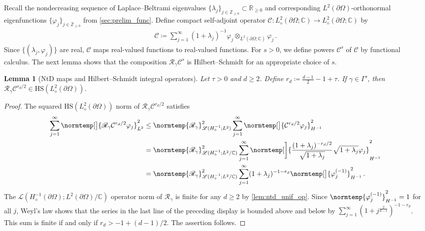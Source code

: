 \documentclass[pdflatex,sn-mathphys-num]{sn-jnl-preprint}
\newcommand{\Z}{\mathbb{Z}}
\newcommand{\R}{\mathbb{R}}
\newcommand{\C}{\mathbb{C}}
\newcommand{\cC}{\mathcal{C}}
\newcommand{\sL}{\mathscr{L}}
\newcommand{\pOmega}{{\partial\Omega}}
\newcommand{\ntd}{\mathscr{R}_{\gamma}}
\newcommand{\norm}{\normtemp}
\newcommand{\defeq}{\coloneqq} %
\newcommand{\HS}{\mathrm{HS}} %
\theoremstyle{thmstyleone}%
\newtheorem{lemma}[theorem]{Lemma}%
\theoremstyle{thmstyletwo}%
\theoremstyle{thmstylethree}%
\numberwithin{equation}{section}
\numberwithin{theorem}{section}
\begin{document}
Recall the nondecreasing sequence of Laplace--Beltrami eigenvalues $\{\lambda_j\}_{j\in\Z_{\geq 0}}\subset\R_{\geq 0}$ and corresponding $L^2(\pOmega)$-orthonormal eigenfunctions $\{\varphi_j\}_{j\in\Z_{\geq 0}}$ from \cref{sec:prelim_func}. Define compact self-adjoint operator $\cC\colon L^2_\diamond(\pOmega;\C)\to L^2_\diamond(\pOmega;\C)$ by
\begin{align}\label{eqn:inverse_shifted_neumann_lap}
    \cC\defeq \sum_{j=1}^\infty(1+\lambda_j)^{-1}\varphi_j\otimes_{L^2(\pOmega;\C)}\varphi_j\,.
\end{align}
Since $\{(\lambda_j,\varphi_j)\}$ are real, $\cC$ maps real-valued functions to real-valued functions.
For $s>0$, we define powers $\cC^s$  of $\cC$ by functional calculus. The next lemma shows that the composition $\ntd \cC^s$ is Hilbert--Schmidt for an appropriate choice of $s$.
\begin{lemma}[NtD maps and Hilbert--Schmidt integral operators]\label{lem:ntd_hs_any_dim}
    Let $\tau>0$ and $d\geq 2$. Define $r_d\defeq \frac{d-1}{2}-1+\tau$. If $\gamma\in \Gamma'$, then $\ntd \cC^{r_d/2}\in\HS(L^2_\diamond(\pOmega))$.
\end{lemma}
\begin{proof}
    The squared $\HS(L^2_\diamond(\pOmega))$ norm of $\ntd \cC^{r_d/2}$ satisfies
    \begin{align*}
        \sum_{j=1}^{\infty}\norm[\big]{\ntd \cC^{r_d/2}\varphi_j}^2_{L^2}&\leq \norm{\ntd}_{\sL(H^{-1}_\diamond;L^2)}^2\sum_{j=1}^{\infty}\norm[\big]{\cC^{r_d/2}\varphi_j}^2_{H^{-1}}\\
        &=\norm{\ntd}_{\sL(H^{-1}_\diamond;L^2/\C)}^2\sum_{j=1}^{\infty}\norm[\bigg]{\frac{(1+\lambda_j)^{-r_d/2}}{\sqrt{1+\lambda_j}} \sqrt{1+\lambda_j}\varphi_j}^2_{H^{-1}}\\
          &=\norm{\ntd}_{\sL(H^{-1}_\diamond;L^2/\C)}^2\sum_{j=1}^{\infty}(1+\lambda_j)^{-1-r_d}\norm[\big]{\varphi_j^{(-1)}}^2_{H^{-1}}\,.
    \end{align*}
    The $\sL(H^{-1}_\diamond(\pOmega);L^2(\pOmega)/\C)$ operator norm of $\ntd$ is finite for any $d\geq 2$ by \cref{lem:ntd_unif_op}. Since $\norm{\varphi_j^{(-1)}}^2_{H^{-1}}=1$ for all $j$, Weyl's law \cite[Corollary~16, p.~194]{abraham2019statistical} shows that the series in the last line of the preceding display is bounded above and below by $\sum_{j=1}^{\infty}(1+j^{\frac{2}{d-1}})^{-1-r_d}$. This sum is finite if and only if $r_d>-1+(d-1)/2$. The assertion follows.
\end{proof}
\end{document}
